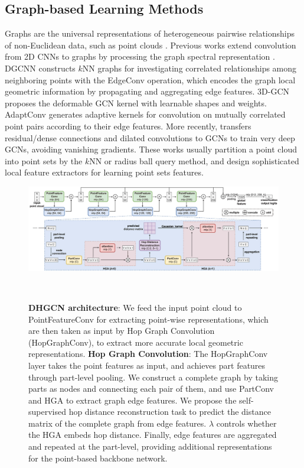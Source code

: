 \documentclass[letterpaper]{article} %
\begin{document}
\subsection{Graph-based Learning Methods}
Graphs are the universal representations of heterogeneous pairwise relationships of non-Euclidean data, such as point clouds \cite{defferrard2016convolutional}. Previous works extend convolution from 2D CNNs to graphs by processing the graph spectral representation \cite{defferrard2016convolutional,kipf2016semi}.
DGCNN \cite{dgcnn} constructs \(k\)NN graphs for investigating correlated relationships among neighboring points with the EdgeConv operation, which encodes the graph local geometric information by propagating and aggregating edge features.
3D-GCN \cite{3dgcn} proposes the deformable GCN kernel with learnable shapes and weights.
AdaptConv \cite{adaptconv} generates adaptive kernels for convolution on mutually correlated point pairs according to their edge features.
More recently, \citet{deepgcns} transfers residual/dense connections and dilated convolutions to GCNs to train very deep GCNs, avoiding vanishing gradients.
These works usually partition a point cloud into point sets by the \(k\)NN or radius ball query method, and design sophisticated local feature extractors for learning point sets features.


\begin{figure}[htbp]
\centering
\begin{minipage}[b]{1.0\linewidth}
\begin{center}
\includegraphics[width=1.0\linewidth]{images/hop_overview.jpg}
\end{center}
\end{minipage}\\
\caption{
\textbf{DHGCN architecture}:
We feed the input point cloud to PointFeatureConv for extracting point-wise representations, which are then taken as input by Hop Graph Convolution (HopGraphConv), to extract more accurate local geometric representations.
\textbf{Hop Graph Convolution}:
The HopGraphConv layer takes the point features as input, and achieves part features through part-level pooling.
We construct a complete graph by taking parts as nodes and connecting each pair of them, and use PartConv and HGA to extract graph edge features.
We propose the self-supervised hop distance reconstruction task to predict the distance matrix of the complete graph from edge features.
\(\lambda\) controls whether the HGA embeds hop distance.
Finally, edge features are aggregated and repeated at the part-level, providing additional representations for the point-based backbone network.
}
\label{fig:netarchi}
\end{figure}
\end{document}
